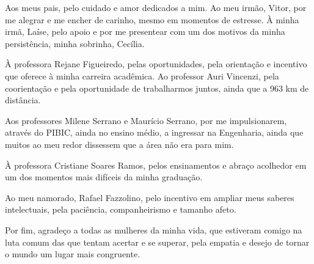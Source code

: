 \begin{agradecimentos}

Aos meus pais, pelo cuidado e amor dedicados a mim. Ao meu irmão, Vitor, por me alegrar e me encher de carinho, mesmo em momentos de estresse. À minha irmã, Laíse, pelo apoio e por me presentear com um dos motivos da minha persistência, minha sobrinha, Cecília.

À professora Rejane Figueiredo, pelas oportunidades, pela orientação e incentivo que oferece à minha carreira acadêmica. Ao professor Auri Vincenzi, pela coorientação e pela oportunidade de trabalharmos juntos, ainda que a 963 km de distância.

Aos professores Milene Serrano e Maurício Serrano, por me impulsionarem, através do PIBIC, ainda no ensino médio, a ingressar na Engenharia, ainda que muitos ao meu redor dissessem que a área não era para mim.

À professora Cristiane Soares Ramos, pelos ensinamentos e abraço acolhedor em um dos momentos mais difíceis da minha graduação. 

Ao meu namorado, Rafael Fazzolino, pelo incentivo em ampliar meus saberes intelectuais, pela paciência, companheirismo e tamanho afeto.

Por fim, agradeço a todas as mulheres da minha vida, que estiveram comigo na luta comum das que tentam acertar e se superar, pela empatia e desejo de tornar o mundo um lugar mais congruente. 

\end{agradecimentos}
